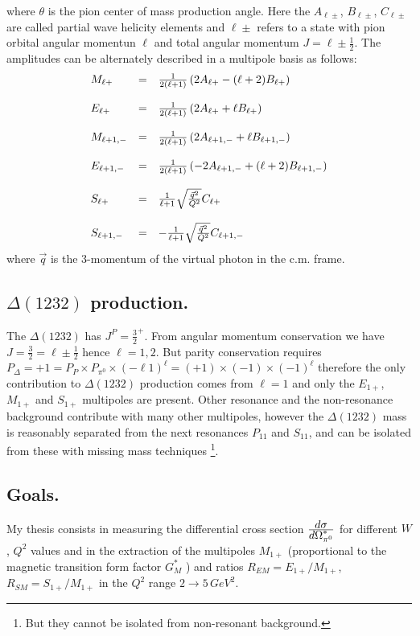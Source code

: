 where $\theta$ is the pion center of mass production angle.
Here the $A_{\ell\pm}$, $B_{\ell\pm}$, $C_{\ell\pm}$ are called partial wave helicity elements and $\ell\pm$ refers
to a state with pion orbital angular momentun $\ell$ and total angular momentum $J=\ell\pm\frac{1}{2}$.
The amplitudes can be alternately described in a multipole basis \cite{bib:chew} as follows:
$$
\begin{array}{l c l}
M_{\ell+} & = & \frac{1}{2(\ell+1)}\left( 2A_{\ell+}-(\ell+2)B_{\ell+}\right) \\
\\
E_{\ell+} & = & \frac{1}{2(\ell+1)}\left( 2A_{\ell+}+\ell B_{\ell+}\right) \\
\\
M_{\ell+1,-} & = & \frac{1}{2(\ell+1)}\left( 2A_{\ell+1,-}+\ell B_{\ell+1,-}\right) \\
\\
E_{\ell+1,-} & = & \frac{1}{2(\ell+1)}\left( -2A_{\ell+1,-}+(\ell+2)B_{\ell+1,-}\right) \\
\\
S_{\ell+} & = & \frac{1}{\ell+1}\sqrt{\frac{\vec{q}^2}{Q^2}}C_{\ell+}\\
\\
S_{\ell+1,-} & = & -\frac{1}{\ell+1}\sqrt{\frac{\vec{q}^2}{Q^2}}C_{\ell+1,-}\\
\end{array}
$$
where $\vec{q}$ is the 3-momentum of the virtual photon in the c.m. frame.
\subsection{$\Delta(1232)$ production.}
The  $\Delta(1232)$ has $J^P = \frac{3}{2}^+$. From angular momentum conservation we have
$J=\frac{3}{2}=\ell\pm\frac{1}{2}$ hence $\ell=1,2$. But parity conservation requires $P_\Delta = +1 = P_P \times P_{\pi^0}\times(-\ell1)^\ell=(+1)\times(-1)\times(-1)^\ell$
therefore the only contribution to $\Delta(1232)$ production comes from $\ell=1$ and only the $E_{1+}$, $M_{1+}$ and $S_{1+}$ multipoles 
are present.
Other resonance and the non-resonance background contribute with many other multipoles, however 
the $\Delta(1232)$ mass is reasonably 
separated from the next resonances $P_{11}$ and $S_{11}$, and can be isolated from these with missing mass techniques
\footnote{But they cannot be isolated from non-resonant background.}.



\subsection{Goals.}
My thesis consists in measuring the differential cross section
$\frac{\displaystyle d\sigma}{\displaystyle d\Omega^*_{\pi^0}}$ for different $W$, $Q^2$ values and 
in the extraction of the multipoles $M_{1+}$ (proportional to the magnetic transition form factor $G_M^*$ ) and ratios $R_{EM}=E_{1+}/M_{1+}$,
$R_{SM}=S_{1+}/M_{1+}$ in the $Q^2$ range $2\rightarrow 5 \, GeV^2$.
 
